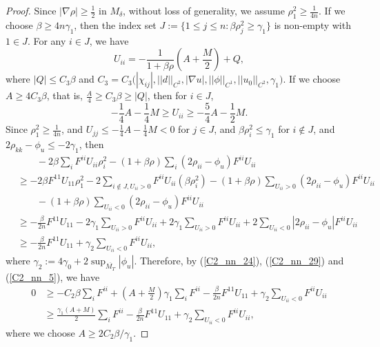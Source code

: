 \documentclass[12pt]{amsart}
\theoremstyle{definition}
\theoremstyle{remark}
\numberwithin{equation}{section}
\begin{document}
\begin{proof}
	
	Since $|\nabla \rho| \geq \frac{1}{2}$ in $M_{\delta}$, 
	without loss of generality, we assume $\rho_1^2 \geq \frac{1}{4n}.$ 
	If we choose $\beta \geq 4n\gamma_1$, then the index set $J := \{ 1 \leq j \leq n : \beta \rho_j^2 \geq \gamma_1 \}$ is non-empty with $1 \in J$. For any $i\in J$, we have
	\begin{equation}%
	U_{ii} = - \frac{1}{1 + \beta \rho} (A + \frac{M}{2}) + Q,
	\end{equation}
	where $|Q| \leq C_3 \beta$ and $C_3 = C_3\big( |\chi_{ij}|, ||d||_{C^2}, |\nabla u|, ||\phi||_{C^1}, ||u_0||_{C^2}, \gamma_1  \big)$. 
	If we choose $A \geq 4 C_3 \beta$, that is, $\frac{A}{4} \geq C_3 \beta \geq |Q|$, then for $i\in J$,
	\begin{equation}\label{C2_nn_28}
	-\frac{1}{4} A - \frac{1}{4}M \geq U_{ii} \geq - \frac{5}{4} A - \frac{1}{2}M.
	\end{equation}
	Since $\rho_1^2 \geq \frac{1}{4n}$, and $U_{jj} \leq -\frac{1}{4} A - \frac{1}{4}M < 0$ for $j \in J$, and $\beta\rho_{i}^2 \leq \gamma_1$ for $i \notin J$, and $2\rho_{kk} - \phi_u \leq -2\gamma_1$, then
	\begin{equation}\label{C2_nn_29}
	\begin{aligned}
	&\qquad - 2 \beta \sum_i F^{ii} U_{ii} \rho_i^2 - (1 + \beta\rho) \sum_i ( 2\rho_{ii} - \phi_{u}) F^{ii} U_{ii} \\
	&\geq - 2 \beta F^{11} U_{11} \rho_1^2 - 2 \sum_{i\notin J, U_{ii}>0} F^{ii} U_{ii} (\beta \rho_i^2) - (1 + \beta\rho) \sum_{U_{ii} > 0} ( 2\rho_{ii} - \phi_{u}) F^{ii} U_{ii}\\
	&\qquad - (1 + \beta\rho) \sum_{U_{ii} < 0} ( 2\rho_{ii} - \phi_{u}) F^{ii} U_{ii}\\
	&\geq - \frac{\beta}{2n} F^{11} U_{11} - 2 \gamma_1 \sum_{ U_{ii}>0} F^{ii} U_{ii} + 2 \gamma_1 \sum_{U_{ii} > 0} F^{ii} U_{ii} + 2 \sum_{U_{ii} < 0} | 2\rho_{ii} - \phi_{u}| F^{ii} U_{ii}\\
	&\geq - \frac{\beta}{2n} F^{11} U_{11} + \gamma_2 \sum_{U_{ii} < 0} F^{ii} U_{ii},
	\end{aligned}
	\end{equation}
	where $\gamma_2 := 4\gamma_0 + 2 \sup_{\overline{M_T}} |\phi_u|.$		
	Therefore, by (\ref{C2_nn_24}), (\ref{C2_nn_29}) and (\ref{C2_nn_5}), we have
	\begin{equation}\label{C2_nn_26}
	\begin{aligned}
	0 &\geq - C_2 \beta \sum_i F^{ii} + (A + \frac{M}{2}) \gamma_1 \sum_i F^{ii} - \frac{\beta}{2n} F^{11} U_{11} + \gamma_2 \sum_{U_{ii} < 0} F^{ii} U_{ii}\\
	&\geq \frac{\gamma_1 (A + M)}{2} \sum_i F^{ii} - \frac{\beta}{2n} F^{11} U_{11} + \gamma_2 \sum_{U_{ii} < 0} F^{ii} U_{ii},
	\end{aligned}
	\end{equation}
	where we choose $A \geq 2C_2\beta /\gamma_1$.
	

\end{proof}
\end{document}
